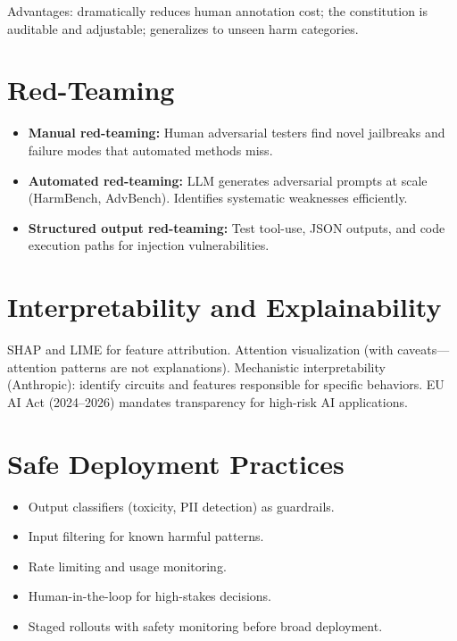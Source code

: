 Advantages: dramatically reduces human annotation cost; the constitution is auditable and adjustable; generalizes to unseen harm categories.

\section{Red-Teaming}

\begin{itemize}
  \item \textbf{Manual red-teaming:} Human adversarial testers find novel jailbreaks and failure modes that automated methods miss.
  \item \textbf{Automated red-teaming:} LLM generates adversarial prompts at scale (HarmBench, AdvBench). Identifies systematic weaknesses efficiently.
  \item \textbf{Structured output red-teaming:} Test tool-use, JSON outputs, and code execution paths for injection vulnerabilities.
\end{itemize}

\section{Interpretability and Explainability}

SHAP and LIME for feature attribution. Attention visualization (with caveats---attention patterns are not explanations). Mechanistic interpretability (Anthropic): identify circuits and features responsible for specific behaviors. EU AI Act (2024--2026) mandates transparency for high-risk AI applications.

\section{Safe Deployment Practices}

\begin{itemize}
  \item Output classifiers (toxicity, PII detection) as guardrails.
  \item Input filtering for known harmful patterns.
  \item Rate limiting and usage monitoring.
  \item Human-in-the-loop for high-stakes decisions.
  \item Staged rollouts with safety monitoring before broad deployment.
\end{itemize}
